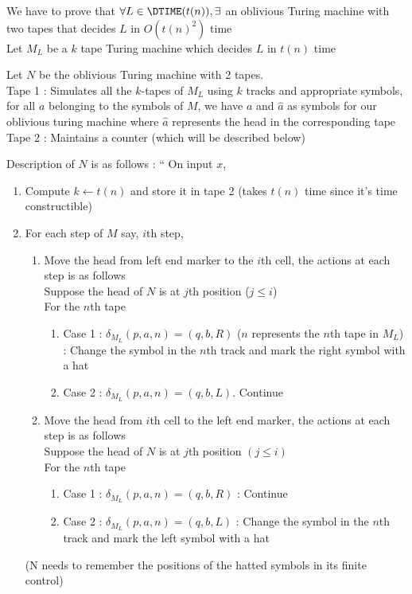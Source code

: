 We have to prove that $\forall L \in \DTIME(t(n)), \exists $ an oblivious Turing machine with two tapes that decides $L$ in $O(t(n)^2)$ time\\
Let $M_L$ be a $k$ tape Turing machine which decides $L$ in $t(n)$ time

Let $N$ be the oblivious Turing machine with 2 tapes.\\
Tape 1 : Simulates all the $k$-tapes of $M_L$ using $k$ tracks and appropriate symbols, for all $a$ belonging to the symbols of $M$, we have $a$ and $\hat{a}$ as symbols for our oblivious turing machine where $\hat{a}$ represents the head in the corresponding tape\\
Tape 2 : Maintains a counter (which will be described below)

Description of $N$ is as follows : 
``
On input $x$,
    \begin{enumerate}
        \item Compute $k \gets t(n)$ and store it in tape 2 (takes $t(n)$ time since it's time constructible)
        \item For each step of $M$ say, $i$th step,
        \begin{enumerate}
            \item Move the head from left end marker to the $i$th cell, the actions at each step is as follows\\
            Suppose the head of $N$ is at $j$th position ($j \leq i$)\\
            For the $n$th tape
            \begin{enumerate}
                \item Case 1 : $\delta_{M_L}(p, a, n) = (q, b, R)$ ($n$ represents the $n$th tape in $M_L$) : Change the symbol in the $n$th track and mark the right symbol with a hat
                \item Case 2 : $\delta_{M_L}(p, a, n) = (q, b, L)$. Continue
            \end{enumerate}
            \item Move the head from $i$th cell to the left end marker, the actions at each step is as follows\\
            Suppose the head of $N$ is at $j$th position $(j \leq i)$\\
            For the $n$th tape
            \begin{enumerate}
                \item Case 1 : $\delta_{M_L}(p, a, n) = (q, b, R)$ : Continue
                \item Case 2 : $\delta_{M_L}(p, a, n) = (q, b, L)$ : Change the symbol in the $n$th track and mark the left symbol with a hat
            \end{enumerate}
        \end{enumerate}
        (N needs to remember the positions of the hatted symbols in its finite control)
    \end{enumerate}
    
